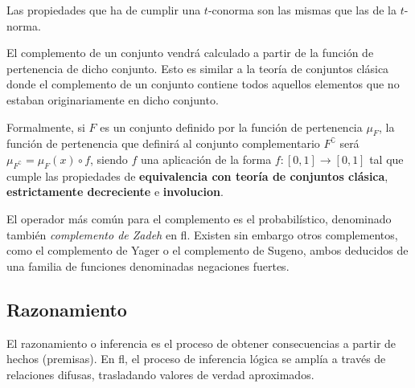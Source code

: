 Las propiedades que ha de cumplir una $t$-conorma son las mismas que las de la $t$-norma.

El complemento de un conjunto vendrá calculado a partir de la función de pertenencia de dicho conjunto. Esto es similar a la teoría de conjuntos clásica donde el complemento de un conjunto contiene todos aquellos elementos que no estaban originariamente en dicho conjunto.

Formalmente, si $F$ es un conjunto definido por la función de pertenencia $\mu_F$, la función de pertenencia que definirá al conjunto complementario $F^\complement$ será $\mu_{F^\complement} = \mu_F(x) \circ f$, siendo $f$ una aplicación de la forma $f : [0,1] \rightarrow [0,1]$ tal que cumple las propiedades de \textbf{equivalencia con teoría de conjuntos clásica}, \textbf{estrictamente decreciente} e \textbf{involucion}.

El operador más común para el complemento es el probabilístico, denominado también \textit{complemento de Zadeh} en \ac{fl}. Existen sin embargo otros complementos, como el complemento de Yager o el complemento de Sugeno, ambos deducidos de una familia de funciones denominadas negaciones fuertes.

\subsection{Razonamiento}

El razonamiento o inferencia es el proceso de obtener consecuencias a partir de hechos (premisas). En \ac{fl}, el proceso de inferencia lógica se amplía a través de relaciones difusas, trasladando valores de verdad aproximados.

